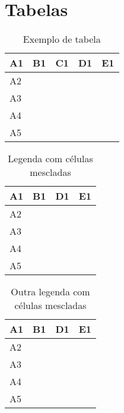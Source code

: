 \documentclass{article}
\begin{document}
\section{Tabelas}


\begin{table}[H]
  \centering
  \label{tab:tab1}
  \begin{tabular}{|l|l|l|l|l|}
  \hline
  A1 & B1 & C1 & D1 & E1 \\ \hline
  A2 &    &    &    &    \\ \hline
  A3 &    &    &    &    \\ \hline
  A4 &    &    &    &    \\ \hline
  A5 &    &    &    &    \\ \hline
  \end{tabular}
  \caption[Legenda Curta]{Exemplo de tabela}
\end{table}

\begin{table}[H]
  \centering
  \label{tab:tab2}
  \begin{tabular}{|l|ll|l|l|}
  \hline
  A1 & \multicolumn{2}{l|}{B1}  & D1 & E1 \\ \hline
  A2 & \multicolumn{1}{l|}{} &  &    &    \\ \hline
  A3 & \multicolumn{1}{l|}{} &  &    &    \\ \hline
  A4 & \multicolumn{1}{l|}{} &  &    &    \\ \hline
  A5 & \multicolumn{1}{l|}{} &  &    &    \\ \hline
  \end{tabular}
  \caption[Legenda Maior]{Legenda com células mescladas}
\end{table}

\begin{table}[H]
  \centering
  \label{tab:tab3}
  \begin{tabular}{|l|ll|ll|}
  \hline
  A1 & \multicolumn{2}{l|}{B1}  & \multicolumn{1}{l|}{D1}      & E1      \\ \hline
  A2 & \multicolumn{1}{l|}{} &  & \multicolumn{2}{l|}{\multirow{2}{*}{}} \\ \cline{1-3}
  A3 & \multicolumn{1}{l|}{} &  & \multicolumn{2}{l|}{}                  \\ \hline
  A4 & \multicolumn{1}{l|}{} &  & \multicolumn{1}{l|}{}        &         \\ \hline
  A5 & \multicolumn{1}{l|}{} &  & \multicolumn{1}{l|}{}        &         \\ \hline
  \end{tabular}
  \caption[Legenda Maior]{Outra legenda com células mescladas}
\end{table}
\end{document}
